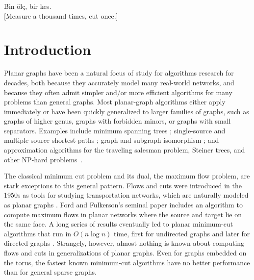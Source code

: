 \documentclass{sig-alternate}
\begin{document}


\bigskip
\begin{rightquote}{0.4}
Bin \"ol\c c, bir kes.\\{}
[Measure a thousand times, cut once.]
\end{rightquote}



\section{Introduction}

Planar graphs have been a natural focus of study for algorithms research for decades, both because they accurately model many real-world networks, and because they often admit simpler and/or more efficient algorithms for many problems than general graphs.  Most planar-graph algorithms either apply immediately or have been quickly generalized to larger families of graphs, such as graphs of higher genus, graphs with forbidden minors, or graphs with small separators.  Examples include minimum spanning trees \cite{p-omst-99, m-tltam-04}; single-source and multiple-source shortest paths \cite{cc-msspg-07, fr-pgnwe-06, hkrs-fspap-97, k-msspp-05, kmw-spdpg-09, lrt-gnd-79, tm-spltm-09}; graph and subgraph isomorphism \cite{g-itegd-00, hw-ltaip-74, m-itgbg-80, e-sipgr-99, e-dtmcg-00}; and approximation algorithms for the traveling salesman problem, Steiner trees, and other NP-hard problems~\cite{bdt-ptass-08, bkk-ptass-07, bkk-stpg-07, dhm-aacd-07, e-dtmcg-00}.

The classical minimum cut problem and its dual, the maximum flow problem, are stark exceptions to this general pattern.  Flows and cuts were introduced in the 1950s as tools for studying transportation networks, which are naturally modeled as planar graphs \cite{hr-fmern-55}.  Ford and Fulkerson's seminal paper \cite{ff-mfn-56} includes an algorithm to compute maximum flows in planar networks where the source and target lie on the same face.  A long series of results eventually led to planar minimum-cut algorithms that run in $O(n\log n)$ time, first for undirected graphs \cite{r-mstcp-83, hj-oamfu-85, f-faspp-87} and later for directed
graphs \cite{jk-mcdpn-92, hkrs-fspap-97}.  Strangely, however, almost nothing is known about computing flows and cuts in generalizations of planar graphs.  Even for graphs embedded on the torus, the fastest known minimum-cut algorithms have no better performance than for general sparse graphs.
\end{document}
